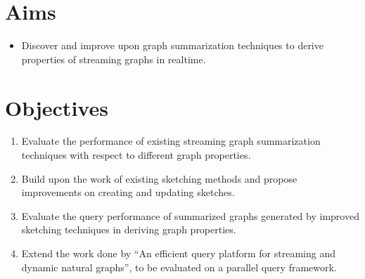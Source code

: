 \section{Aims}
\begin{itemize}
    \item Discover and improve upon graph summarization techniques to derive
        properties of streaming graphs in realtime. 
\end{itemize}

\section{Objectives}

\begin{enumerate}
    \item Evaluate the performance of existing streaming graph summarization 
        techniques with respect to different graph properties. 
    \item Build upon the work of existing sketching methods and propose 
        improvements on creating and updating sketches.
    \item Evaluate the query performance of summarized graphs generated by 
        improved sketching techniques in deriving graph properties. 
    \item Extend the work done by “An efficient query platform for streaming 
        and dynamic natural graphs”\cite{kumarage_efficient_2017}, to be evaluated 
        on a parallel query framework.
\end{enumerate}